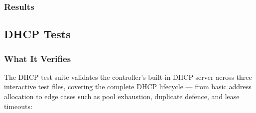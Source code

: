 \documentclass[12pt,a4paper]{article}
\begin{document}
\subsubsection{Results}

\begin{center}
\end{center}

\subsection{DHCP Tests}

\subsubsection{What It Verifies}

The DHCP test suite validates the controller's built-in DHCP server across three interactive test files, covering the complete DHCP lifecycle --- from basic address allocation to edge cases such as pool exhaustion, duplicate defence, and lease timeouts:
\end{document}
